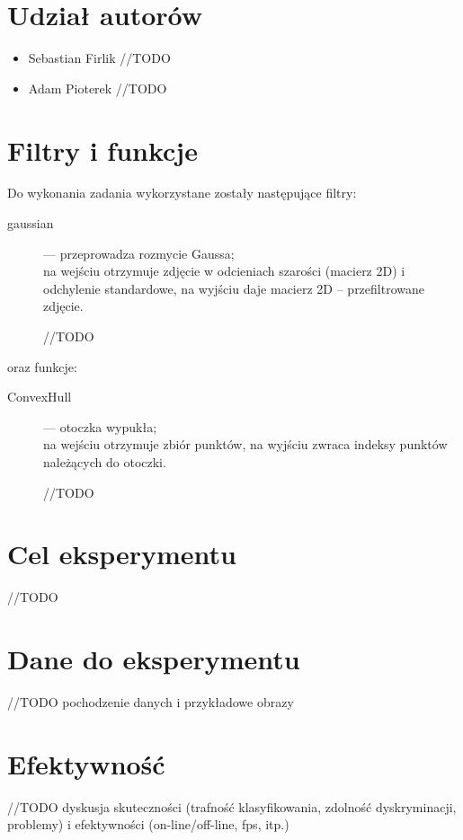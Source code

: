 \documentclass{article}
\begin{document}


\section*{Udział autorów}
\begin{itemize}
\item Sebastian Firlik //TODO
\item Adam Pioterek //TODO
\end{itemize}

\section{Filtry i funkcje}
Do wykonania zadania wykorzystane zostały następujące filtry:
\begin{description}
\item[gaussian] — przeprowadza rozmycie Gaussa;\\
na wejściu otrzymuje zdjęcie w odcieniach szarości (macierz 2D) i odchylenie standardowe, na wyjściu daje macierz 2D – przefiltrowane zdjęcie.

//TODO
\end{description}
oraz funkcje:
\begin{description}
\item[ConvexHull] — otoczka wypukła;\\
na wejściu otrzymuje zbiór punktów, na wyjściu zwraca indeksy punktów należących do otoczki.

//TODO
\end{description}
 
\section{Cel eksperymentu}
//TODO
\section{Dane do eksperymentu}
//TODO pochodzenie danych i przykładowe obrazy
\section{Efektywność}
//TODO dyskusja skuteczności (trafność klasyfikowania, zdolność dyskryminacji, problemy) i efektywności (on-line/off-line, fps, itp.)
\end{document}
